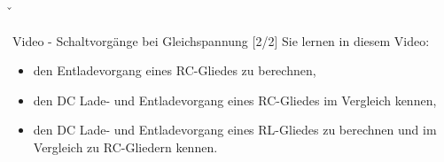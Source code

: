 \v{%
\begin{frame}
    \begin{Lernziele}{Video - Schaltvorgänge bei Gleichspannung [2/2]}
        Sie lernen in diesem Video:
        \begin{itemize}\b{\setlength\itemsep{0.7em}}
            \item den Entladevorgang eines RC-Gliedes zu berechnen,
            \item den DC Lade- und Entladevorgang eines RC-Gliedes im Vergleich kennen,
            \item den DC Lade- und Entladevorgang eines RL-Gliedes zu berechnen und im Vergleich zu RC-Gliedern kennen.
        \end{itemize}
    \end{Lernziele}
\end{frame}%

}%

